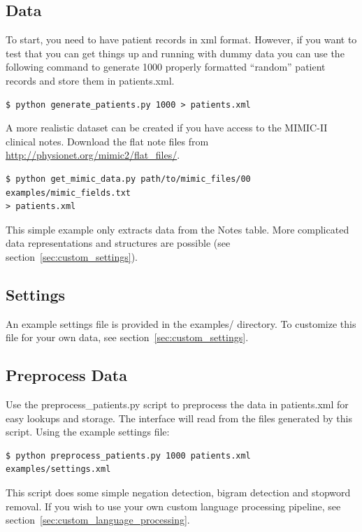 \documentclass[12pt]{article}
\begin{document}
\subsection{Data}
To start, you need to have patient records in xml format. 
However, if you want to test that you can get things up and running with dummy data you can use the following command to generate 1000 properly formatted ``random'' patient records and store them in patients.xml.

\begin{verbatim}
$ python generate_patients.py 1000 > patients.xml
\end{verbatim}

A more realistic dataset can be created if you have access to the MIMIC-II clinical notes. Download the flat note files from \url{http://physionet.org/mimic2/flat_files/}.

\begin{verbatim}
$ python get_mimic_data.py path/to/mimic_files/00 examples/mimic_fields.txt 
> patients.xml
\end{verbatim}

This simple example only extracts data from the Notes table. More complicated data representations and structures are possible (see section~\ref{sec:custom_settings}).

\subsection{Settings}
An example settings file is provided in the examples/ directory. To customize this file for your own data, see section~\ref{sec:custom_settings}.

\subsection{Preprocess Data}

Use the preprocess\_patients.py script to preprocess the data in patients.xml for easy lookups and storage. The interface will read from the files generated by this script. Using the example settings file:

\begin{verbatim}
$ python preprocess_patients.py 1000 patients.xml examples/settings.xml
\end{verbatim}

This script does some simple negation detection, bigram detection and stopword removal.
If you wish to use your own custom language processing pipeline, see section~\ref{sec:custom_language_processing}.
\end{document}
